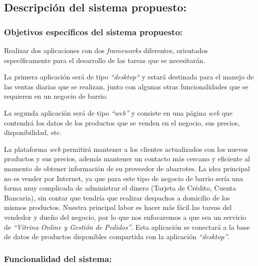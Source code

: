 \documentclass[a4paper,12pt]{article}
\begin{document}
\newpage

\subsection{Descripción del sistema propuesto:}

 \subsubsection{Objetivos específicos del sistema propuesto:}
  Realizar dos aplicaciones con dos \emph{frameworks} diferentes, orientados específicamente para el desarrollo de las tareas
  que se necesitarán. 

  La primera aplicación será de tipo \emph{``desktop``} y estará destinada para el manejo de las ventas
  diarias que se realizan, junto con algunas otras funcionalidades que se requieren en un negocio de barrio.

  La segunda aplicación será de tipo \emph{``web''} y consiste en una página \emph{web} que contendrá los datos de los productos que
  se venden en el negocio, sus precios, disponibilidad, etc.
  
  La plataforma \emph{web} permitirá mantener a los clientes actualizados con los nuevos productos y sus precios, además mantener un 
  contacto más cercano y eficiente al momento de obtener información de su proveedor de abarrotes. 
  La idea principal no es vender por Internet, ya que para este tipo de negocio de barrio sería una forma muy complicada de
  administrar el dinero (Tarjeta de Crédito, Cuenta Bancaria), sin contar que tendría que realizar despachos a domicilio
  de los mismos productos. 
  Nuestra principal labor es hacer más fácil las tareas del vendedor y dueño del negocio, por lo que nos enfocaremos a 
  que sea un servicio de \emph{``Vitrina Online y Gestión de Pedidos''}. Esta aplicación se conectará a la base de datos 
  de productos disponibles compartida con la aplicación \emph{``desktop''}.

\newpage

\subsubsection{Funcionalidad del sistema:}
\end{document}
